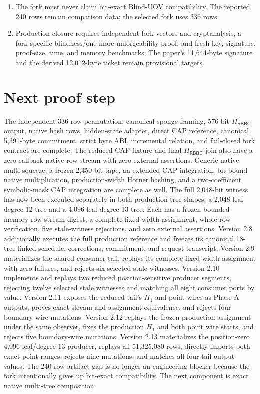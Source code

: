 \documentclass[11pt]{article}
\newcommand{\RBBC}{\mathsf{RBBC}}
\begin{document}
\begin{enumerate}[label=INV-\arabic*,leftmargin=*]
  parent-circuit wire identities are still required.
  \item The fork must never claim bit-exact Blind-UOV compatibility.  The
  reported 240 rows remain comparison data; the selected fork uses 336 rows.
  \item Production closure requires independent fork vectors and cryptanalysis,
  a fork-specific blindness/one-more-unforgeability proof, and fresh key,
  signature, proof-size, time, and memory benchmarks.  The paper's 11,644-byte
  signature and the derived 12,012-byte ticket remain provisional targets.
\end{enumerate}

\section{Next proof step}

The independent 336-row permutation, canonical sponge framing, 576-bit
$H_{\RBBC}$ output, native hash rows, hidden-state adapter, direct CAP reference,
canonical 5,391-byte commitment, strict byte ABI, incremental relation, and
fail-closed fork contract are complete.  The reduced CAP fixture and final
$H_{\RBBC}$ join also have a zero-callback native row stream with zero external
assertions.  Generic native multi-squeeze, a frozen 2,450-bit tape, an extended
CAP integration, bit-bound native multiplication, production-width Horner
hashing, and a two-coefficient symbolic-mask CAP integration are complete as
well.  The full 2,048-bit witness has now been executed separately in both
production tree shapes: a 2,048-leaf degree-12 tree and a 4,096-leaf degree-13
tree.  Each has a frozen bounded-memory row-stream digest, a complete
  fixed-width assignment, whole-row verification, five stale-witness rejections,
  and zero external assertions.  Version 2.8 additionally executes the full
  production reference and freezes its canonical 18-tree linked schedule,
  corrections, commitment, and request transcript.  Version 2.9 materializes
  the shared consumer tail, replays its complete fixed-width assignment with
  zero failures, and rejects six selected stale witnesses.  Version 2.10
  implements and replays two reduced position-sensitive producer segments,
  rejecting twelve selected stale witnesses and matching all eight consumer
  ports by value.  Version 2.11 exposes the reduced tail's $H_1$ and point
  wires as Phase-A outputs, proves exact stream and assignment equivalence,
  and rejects four boundary-wire mutations.  Version 2.12 replays the frozen
  production assignment under the same observer, fixes the production $H_1$
  and both point wire starts, and rejects five boundary-wire mutations.
  Version 2.13 materializes the position-zero 4,096-leaf/degree-13 producer,
  replays all 51,325,080 rows, directly imports both exact point ranges,
  rejects nine mutations, and matches all four tail output values.  The 240-row
artifact gap is no longer
an engineering blocker because the fork intentionally gives up bit-exact
compatibility.  The next component is exact native multi-tree composition:
\end{document}
